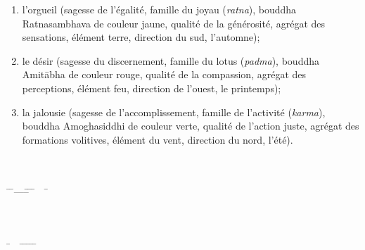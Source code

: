 \begin{tabbing}
{\begin{enumerate}
      (\emph{vajra}), bouddha Ak\d{s}obhya de couleur bleue, qualité
      de la clarté immuable, agrégat de la conscience, élément eau,
      direction de l'est, l'hiver);
    \item l'orgueil (sagesse de l'égalité, famille du joyau
      (\emph{ratna}), bouddha Ratnasambhava de couleur jaune, qualité
      de la générosité, agrégat des sensations, élément terre,
      direction du sud, l'automne);
    \item le désir (sagesse du discernement, famille du lotus
      (\emph{padma}), bouddha Amit\={a}bha de couleur rouge, qualité
      de la compassion, agrégat des perceptions, élément feu,
      direction de l'ouest, le printemps);
    \item la jalousie
      (sagesse de l'accomplissement, famille de l'activité
      (\emph{karma}), bouddha Amoghasiddhi de couleur verte, qualité
      de l'action juste, agrégat des formations volitives, élément du
      vent, direction du nord, l'été).
   \end{enumerate}}\\
\>\\
\> \ \=
\=-----\= \= \qquad \=
\ \ \=\\ \>
\> \> \> \>
\> \>\\ \>\\ \>\\ \> \ \= \ \ \=
\= \=  \=
\=\\ \> \> \>
\> \> \>
\>\\ \>
\end{tabbing}

\newpage
\label{compassion}

 \hrulefill

